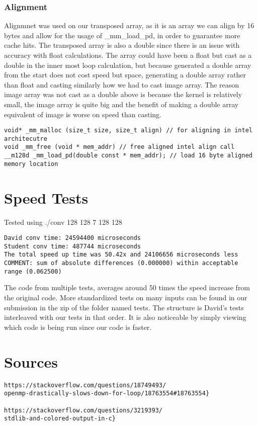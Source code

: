 \documentclass[12pt,fleqn,leqno,letterpaper]{article}
\begin{document}
\subsubsection{Alignment}
Alignmnet was used on our transposed array, as it is an array we can align by 16 bytes and allow
for the usage of \_mm\_load\_pd, in order to guarantee more cache hits. The transposed array is
also a double since there is an issue with accuracy with float calculations. The array could have
been a float but cast as a double in the inner most loop calculation, but because generated a double
array from the start does not cost speed but space, generating a double array rather than float and casting
similarly how we had to cast image array. The reason image array was not cast as a double above is because
the kernel is relatively small, the image array is quite big and the benefit of making a double array equivalent
of image is worse on speed than casting. 

\begin{verbatim}
void* _mm_malloc (size_t size, size_t align) // for aligning in intel architecutre
void _mm_free (void * mem_addr) // free aligned intel align call
__m128d _mm_load_pd(double const * mem_addr); // load 16 byte aligned memory location
\end{verbatim}

\section{Speed Tests}
Tested using ./conv 128 128 7 128 128
\begin{verbatim}
David conv time: 24594400 microseconds
Student conv time: 487744 microseconds
The total speed up time was 50.42x and 24106656 microseconds less
COMMENT: sum of absolute differences (0.000000) within acceptable range (0.062500)
\end{verbatim}
The code from multiple tests, averages around 50 times the speed increase from the original
code. More standardized tests on many inputs can be found in our submission in the zip of 
the folder named tests. The structure is David's tests interleaved with our tests in that order.
It is also noticeable by simply viewing which code is being run since our code is faster.

\section{Sources}
\begin{verbatim}
https://stackoverflow.com/questions/18749493/
openmp-drastically-slows-down-for-loop/18763554#18763554}

https://stackoverflow.com/questions/3219393/
stdlib-and-colored-output-in-c}
\end{verbatim}
%
\end{document}
